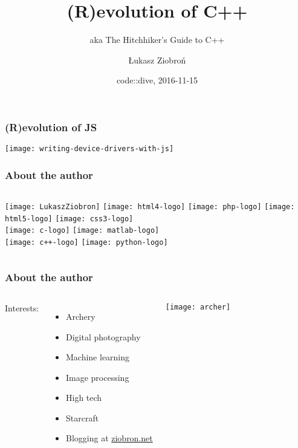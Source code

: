 \author{Łukasz Ziobroń}
\title[Crisis]{(R)evolution of C++}
\date{code::dive, 2016-11-15}
\subject{Computer Science}
\subtitle{aka The Hitchhiker's Guide to C++}

\begin{frame}
\titlepage
\end{frame}

\begin{frame}
  \frametitle{(R)evolution of JS}
  \centering 
  \texttt{[image: writing-device-drivers-with-js]}
\end{frame}

\begin{frame}
  \frametitle{About the author}
  \begin{columns}
      \texttt{[image: LukaszZiobron]}
      \centering
      \texttt{[image: html4-logo]} \pause
      \texttt{[image: php-logo]} \pause
      \texttt{[image: html5-logo]}
      \texttt{[image: css3-logo]} \\ \pause
      \texttt{[image: c-logo]} \pause
      \texttt{[image: matlab-logo]} \\ \pause
      \texttt{[image: c++-logo]} \pause %
      \texttt{[image: python-logo]}
  \end{columns}
\end{frame}


\begin{frame}
    \frametitle{About the author}
    \begin{columns}
        Interests:
        \begin{itemize}%
            \item Archery
            \item Digital photography
            \item Machine learning
            \item Image processing
            \item High tech
            \item Starcraft
            \item Blogging at \url{ziobron.net}
        \end{itemize}
        \texttt{[image: archer]}
    \end{columns}
\end{frame}


